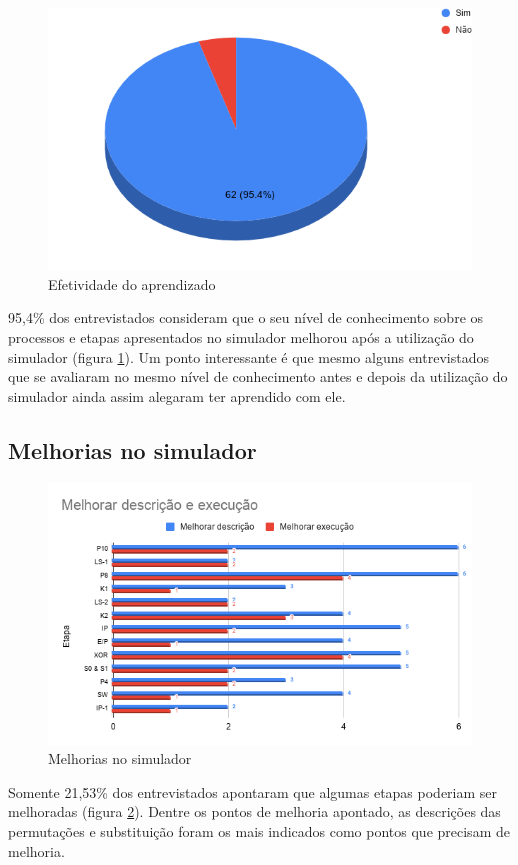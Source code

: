 \begin{figure}[H]
    \centering
    \caption{Efetividade do aprendizado}
    \label{fig:efetividadeaprendizadoresp}
    \includegraphics[width=.65\linewidth]{Questionario/CQ4.png}
\end{figure}

95,4\% dos entrevistados consideram que o seu nível de conhecimento sobre os processos e etapas apresentados no simulador melhorou após a utilização do simulador (figura \ref{fig:efetividadeaprendizadoresp}). Um ponto interessante é que mesmo alguns entrevistados que se avaliaram no mesmo nível de conhecimento antes e depois da utilização do simulador ainda assim alegaram ter aprendido com ele.

\subsection{Melhorias no simulador}

\begin{figure}[H]
    \centering
    \caption{Melhorias no simulador}
    \label{fig:melhoriasresp}
    \includegraphics[width=.9\linewidth]{Questionario/CQ5Q6.png}
\end{figure}

Somente 21,53\% dos entrevistados apontaram que algumas etapas poderiam ser melhoradas (figura \ref{fig:melhoriasresp}). Dentre os pontos de melhoria apontado, as descrições das permutações e substituição foram os mais indicados como pontos que precisam de melhoria.
